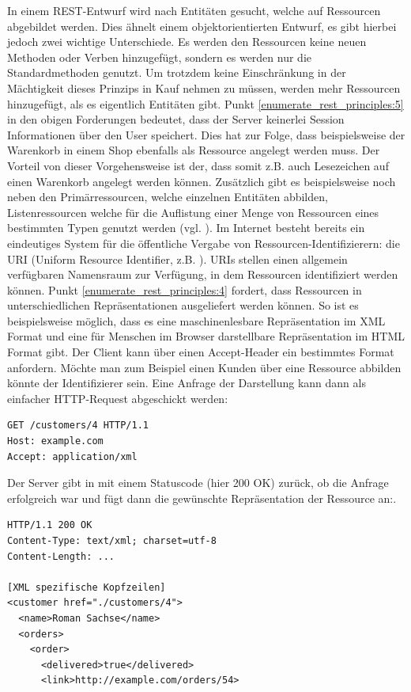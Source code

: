 In einem REST-Entwurf wird nach Entitäten gesucht, welche auf Ressourcen abgebildet werden. Dies ähnelt einem objektorientierten Entwurf, es gibt hierbei jedoch zwei wichtige Unterschiede. Es werden den Ressourcen keine neuen Methoden oder Verben hinzugefügt, sondern es werden nur die Standardmethoden genutzt. Um trotzdem keine Einschränkung in der Mächtigkeit dieses Prinzips in Kauf nehmen zu müssen, werden mehr Ressourcen hinzugefügt, als es eigentlich Entitäten gibt. Punkt \ref{enumerate_rest_principles:5} in den obigen Forderungen bedeutet, dass der Server keinerlei Session Informationen über den User speichert. Dies hat zur Folge, dass beispielsweise der Warenkorb in einem Shop ebenfalls als Ressource angelegt werden muss. Der Vorteil von dieser Vorgehensweise ist der, dass somit z.B. auch Lesezeichen auf einen Warenkorb angelegt werden können. Zusätzlich gibt es beispielsweise noch neben den Primärressourcen, welche einzelnen Entitäten abbilden, Listenressourcen welche für die Auflistung einer Menge von Ressourcen eines bestimmten Typen genutzt werden (vgl. \cite{tilkovrestchapter4}). Im Internet besteht bereits ein eindeutiges System für die öffentliche Vergabe von Ressourcen-Identifizierern: die URI (Uniform Resource Identifier, z.B. ). URIs stellen einen allgemein verfügbaren Namensraum zur Verfügung, in dem Ressourcen identifiziert werden können. Punkt \ref{enumerate_rest_principles:4} fordert, dass Ressourcen in unterschiedlichen Repräsentationen ausgeliefert werden können. So ist es beispielsweise möglich, dass es eine maschinenlesbare Repräsentation im XML Format und eine für Menschen im Browser darstellbare Repräsentation im HTML Format gibt. Der Client kann über einen Accept-Header ein bestimmtes Format anfordern.
Möchte man zum Beispiel einen Kunden über eine Ressource abbilden könnte der Identifizierer  sein. Eine Anfrage der Darstellung kann dann als einfacher HTTP-Request abgeschickt werden:
\begin{lstlisting}
GET /customers/4 HTTP/1.1
Host: example.com
Accept: application/xml 
\end{lstlisting}
Der Server gibt in mit einem Statuscode (hier 200 OK) zurück, ob die Anfrage erfolgreich war und fügt dann die gewünschte Repräsentation der Ressource an:.
\begin{lstlisting}
HTTP/1.1 200 OK
Content-Type: text/xml; charset=utf-8
Content-Length: ...

[XML spezifische Kopfzeilen]
<customer href="./customers/4">
  <name>Roman Sachse</name>
  <orders>
    <order>
      <delivered>true</delivered>
      <link>http://example.com/orders/54>
\end{lstlisting}
